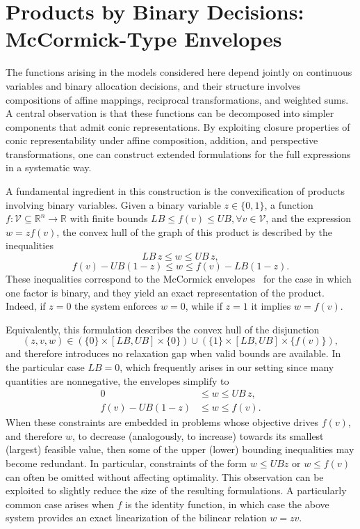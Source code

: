 \documentclass[a4paper,11pt,reqno]{amsart}
\begin{document}
\appendix

\section{Products by Binary Decisions: McCormick-Type Envelopes}\label{app_McCormick}

The functions arising in the models considered here depend jointly on continuous variables and binary allocation decisions, and their structure involves compositions of affine mappings, reciprocal transformations, and weighted sums. A central observation is that these functions can be decomposed into simpler components that admit conic representations. By exploiting closure properties of conic representability under affine composition, addition, and perspective transformations, one can construct extended formulations for the full expressions in a systematic way.

A fundamental ingredient in this construction is the convexification of products involving binary variables. Given a binary variable $z \in \{0,1\}$, a function $f:\mathcal{V} \subseteq \mathbb{R}^n \to \mathbb{R}$ with finite bounds $LB \le f(v) \le UB, \forall v\in\mathcal{V}$, and the expression $w = z f(v)$, the convex hull of the graph of this product is described by the inequalities
$$
LB\, z \le w \le UB\, z,
$$
$$
f(v) - UB (1-z) \le w \le f(v) - LB (1-z).
$$
These inequalities correspond to the McCormick envelopes~\citep{McCormick1976} for the case in which one factor is binary, and they yield an exact representation of the product. Indeed, if $z=0$ the system enforces $w=0$, while if $z=1$ it implies $w=f(v)$.

Equivalently, this formulation describes the convex hull of the disjunction
$$
(z,v,w) \in 
(
\{0\} \times [LB,UB] \times \{0\})\cup
(\{1\} \times [LB,UB] \times \{f(v)\}),
$$
and therefore introduces no relaxation gap when valid bounds are available. In the particular case $LB=0$, which frequently arises in our setting since many quantities are nonnegative, the envelopes simplify to
\begin{align*}
0 &\le w \le UB\, z,\\
f(v) - UB (1-z) &\le w \le f(v).
\end{align*}
When these constraints are embedded in problems whose objective drives $f(v)$, and therefore $w$, to decrease (analogously, to increase) towards its smallest (largest) feasible value, then some of the upper (lower) bounding inequalities may become redundant. In particular, constraints of the form $w \le UB z$ or $w \le f(v)$ can often be omitted without affecting optimality. This observation can be exploited to slightly reduce the size of the resulting formulations. A particularly common case arises when $f$ is the identity function, in which case the above system provides an exact linearization of the bilinear relation $w = z v$.
\end{document}
